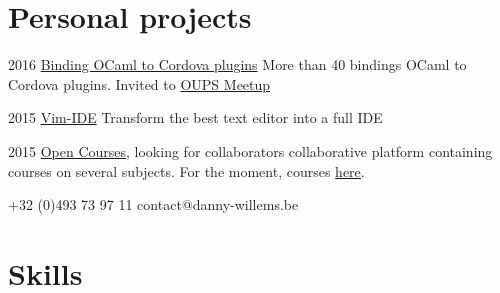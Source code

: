 \documentclass[fontsize=10pt]{tccv}
\begin{document}
\section{Personal projects}

\begin{yearlist}

\item{2016}
     {\href{https://github.com/dannywillems/ocaml-cordova-plugin-list}{Binding
      OCaml to Cordova plugins}}
     {More than 40 bindings OCaml to Cordova plugins. Invited to
       \href{http://www.meetup.com/fr-FR/ocaml-paris/}{OUPS Meetup}}


\item{2015}
     {\href{http://github.com/vim-ide/vim-ide/}{Vim-IDE}}
     {Transform the best text editor into a full IDE}

\item{2015}
     {\href{http://open-courses.org/}{Open Courses}, looking for collaborators}
     {collaborative platform containing courses on several subjects. For the
     moment, courses \href{https://github.com/open-courses}{here}}.



\end{yearlist}

    {+32 (0)493 73 97 11}
    {contact@danny-willems.be}

\section{Skills}
\end{document}
